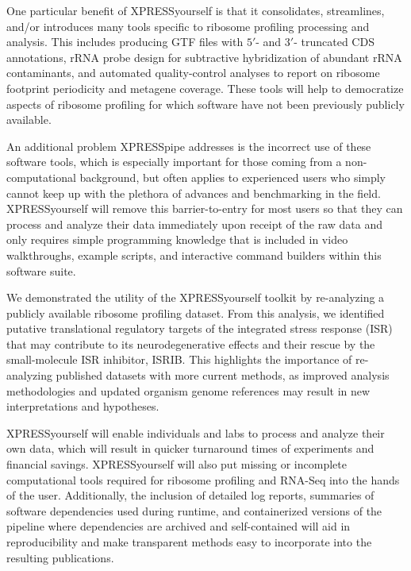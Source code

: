 \documentclass[10pt, oneside]{article}
\begin{document}
\begin{multicols}{2}
One particular benefit of XPRESSyourself is that it consolidates, streamlines, and/or introduces many tools specific to ribosome profiling processing and analysis. This includes producing GTF files with $5'$- and $3'$- truncated CDS annotations, rRNA probe design for subtractive hybridization of abundant rRNA contaminants, and automated quality-control analyses to report on ribosome footprint periodicity and metagene coverage. These tools will help to democratize aspects of ribosome profiling for which software have not been previously publicly available. \par

An additional problem XPRESSpipe addresses is the incorrect use of these software tools, which is especially important for those coming from a non-computational background, but often applies to experienced users who simply cannot keep up with the plethora of advances and benchmarking in the field. XPRESSyourself will remove this barrier-to-entry for most users so that they can process and analyze their data immediately upon receipt of the raw data and only requires simple programming knowledge that is included in video walkthroughs, example scripts, and interactive command builders within this software suite. \par

We demonstrated the utility of the XPRESSyourself toolkit by re-analyzing a publicly available ribosome profiling dataset. From this analysis, we identified putative translational regulatory targets of the integrated stress response (ISR) that may contribute to its neurodegenerative effects and their rescue by the small-molecule ISR inhibitor, ISRIB. This highlights the importance of re-analyzing published datasets with more current methods, as improved analysis methodologies and updated organism genome references may result in new interpretations and hypotheses. \par

XPRESSyourself will enable individuals and labs to process and analyze their own data, which will result in quicker turnaround times of experiments and financial savings. XPRESSyourself will also put missing or incomplete computational tools required for ribosome profiling and RNA-Seq into the hands of the user. Additionally, the inclusion of detailed log reports, summaries of software dependencies used during runtime, and containerized versions of the pipeline where dependencies are archived and self-contained will aid in reproducibility and make transparent methods easy to incorporate into the resulting publications. \par



\end{multicols}
\end{document}
